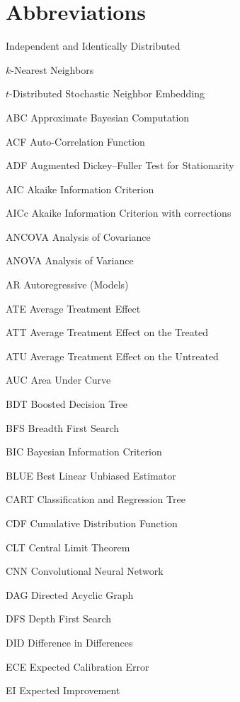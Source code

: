 \clearpage
\section*{Abbreviations}

\begin{symbollist}
  \item[\iid] Independent and Identically Distributed
  \item[\kNN] $k$-Nearest Neighbors
  \item[\tSNE] $t$-Distributed Stochastic Neighbor Embedding
  \item[ABC] Approximate Bayesian Computation
  \item[ACF] Auto-Correlation Function
  \item[ADF] Augmented Dickey--Fuller Test for Stationarity
  \item[AIC] Akaike Information Criterion
  \item[AICc] Akaike Information Criterion with corrections
  \item[ANCOVA] Analysis of Covariance
  \item[ANOVA] Analysis of Variance
  \item[AR] Autoregressive (Models)
  \item[ATE] Average Treatment Effect
  \item[ATT] Average Treatment Effect on the Treated
  \item[ATU] Average Treatment Effect on the Untreated
  \item[AUC] Area Under Curve
  \item[BDT] Boosted Decision Tree
  \item[BFS] Breadth First Search
  \item[BIC] Bayesian Information Criterion
  \item[BLUE] Best Linear Unbiased Estimator
  \item[CART] Classification and Regression Tree
  \item[CDF] Cumulative Distribution Function
  \item[CLT] Central Limit Theorem
  \item[CNN] Convolutional Neural Network
  \item[DAG] Directed Acyclic Graph
  \item[DFS] Depth First Search
  \item[DID] Difference in Differences
  \item[ECE] Expected Calibration Error
  \item[EI] Expected Improvement

\end{symbollist}
